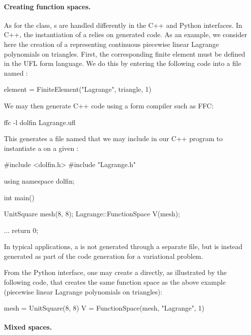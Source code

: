 \paragraph{Creating function spaces.}

As for the  class, s are handled
differently in the C++ and Python interfaces. In C++, the instantiation
of a  relies on generated code. As an example,
we consider here the creation of a  representing
continuous piecewise linear Lagrange polynomials on triangles. First,
the corresponding finite element must be defined in the UFL form
language. We do this by entering the following code into a file named
:
\begin{uflcode}
element = FiniteElement("Lagrange", triangle, 1)
\end{uflcode}
We may then generate C++ code using a form compiler such as FFC:
\begin{bash}
ffc -l dolfin Lagrange.ufl
\end{bash}
This generates a file named  that we may include in
our C++ program to instantiate a  on a given
:
\begin{c++}
#include <dolfin.h>
#include "Lagrange.h"

using namespace dolfin;

int main()
{
  UnitSquare mesh(8, 8);
  Lagrange::FunctionSpace V(mesh);

  ...
  return 0;
}
\end{c++}
In typical applications, a  is not generated
through a separate  file, but is instead generated as part
of the code generation for a variational problem.

From the Python interface, one may create a 
directly, as illustrated by the following code, that creates the same
function space as the above example (piecewise linear Lagrange
polynomials on triangles):

\begin{python}
mesh = UnitSquare(8, 8)
V = FunctionSpace(mesh, "Lagrange", 1)
\end{python}

\paragraph{Mixed spaces.}

